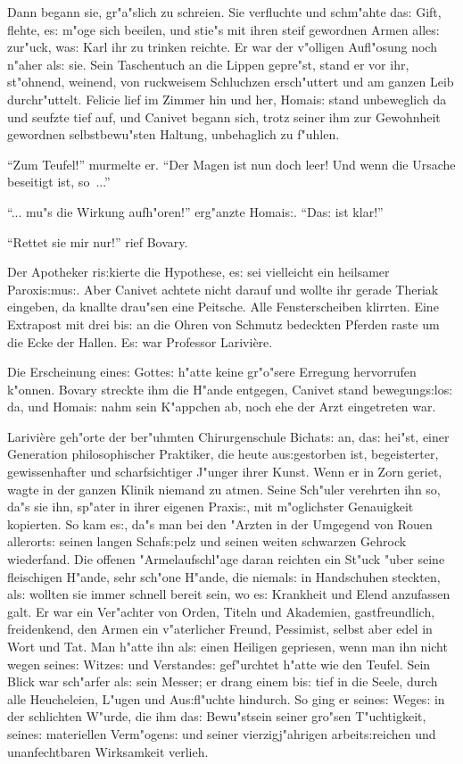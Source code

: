 \documentclass[oneside,12pt]{book}
\newcommand{\s}{s:}%
\begin{document}
Dann begann sie, gr"a"slich zu schreien. Sie verfluchte und
schm"ahte da{\s} Gift, flehte, e{\s} m"oge sich beeilen, und
stie"s mit ihren steif gewordnen Armen alle{\s} zur"uck, wa{\s}
Karl ihr zu trinken reichte. Er war der v"olligen Aufl"osung noch
n"aher al{\s} sie. Sein Taschentuch an die Lippen gepre"st, stand
er vor ihr, st"ohnend, weinend, von ruckweisem Schluchzen
ersch"uttert und am ganzen Leib durchr"uttelt. Felicie lief im
Zimmer hin und her, Homai{\s} stand unbeweglich da und seufzte
tief auf, und Canivet begann sich, trotz seiner ihm zur Gewohnheit
gewordnen selbstbewu"sten Haltung, unbehaglich zu f"uhlen.

"`Zum Teufel!"' murmelte er. "`Der Magen ist nun doch leer! Und
wenn die Ursache beseitigt ist, so~..."'

"`... mu"s die Wirkung aufh"oren!"' erg"anzte Homai{\s}. "`Da{\s}
ist klar!"'

"`Rettet sie mir nur!"' rief Bovary.

Der Apotheker ri{\s}kierte die Hypothese, e{\s} sei vielleicht ein
heilsamer Paroxi{\s}mu{\s}. Aber Canivet achtete nicht darauf und
wollte ihr gerade Theriak eingeben, da knallte drau"sen eine
Peitsche. Alle Fensterscheiben klirrten. Eine Extrapost mit drei
bi{\s} an die Ohren von Schmutz bedeckten Pferden raste um die
Ecke der Hallen. E{\s} war Professor Larivi\`ere.

Die Erscheinung eine{\s} Gotte{\s} h"atte keine gr"o"sere Erregung
hervorrufen k"onnen. Bovary streckte ihm die H"ande entgegen,
Canivet stand bewegung{\s}lo{\s} da, und Homai{\s} nahm sein
K"appchen ab, noch ehe der Arzt eingetreten war.

Larivi\`ere geh"orte der ber"uhmten Chirurgenschule Bichat{\s} an,
da{\s} hei"st, einer Generation philosophischer Praktiker, die
heute au{\s}gestorben ist, begeisterter, gewissenhafter und
scharfsichtiger J"unger ihrer Kunst. Wenn er in Zorn geriet, wagte
in der ganzen Klinik niemand zu atmen. Seine Sch"uler verehrten
ihn so, da"s sie ihn, sp"ater in ihrer eigenen Praxi{\s}, mit
m"oglichster Genauigkeit kopierten. So kam e{\s}, da"s man bei den
"Arzten in der Umgegend von Rouen allerort{\s} seinen langen
Schaf{\s}pelz und seinen weiten schwarzen Gehrock wiederfand. Die
offenen "Armelaufschl"age daran reichten ein St"uck "uber seine
fleischigen H"ande, sehr sch"one H"ande, die niemal{\s} in
Handschuhen steckten, al{\s} wollten sie immer schnell bereit
sein, wo e{\s} Krankheit und Elend anzufassen galt. Er war ein
Ver"achter von Orden, Titeln und Akademien, gastfreundlich,
freidenkend, den Armen ein v"aterlicher Freund, Pessimist, selbst
aber edel in Wort und Tat. Man h"atte ihn al{\s} einen Heiligen
gepriesen, wenn man ihn nicht wegen seine{\s} Witze{\s} und
Verstande{\s} gef"urchtet h"atte wie den Teufel. Sein Blick war
sch"arfer al{\s} sein Messer; er drang einem bi{\s} tief in die
Seele, durch alle Heucheleien, L"ugen und Au{\s}fl"uchte hindurch.
So ging er seine{\s} Wege{\s} in der schlichten W"urde, die ihm
da{\s} Bewu"stsein seiner gro"sen T"uchtigkeit, seine{\s}
materiellen Verm"ogen{\s} und seiner vierzigj"ahrigen
arbeit{\s}reichen und unanfechtbaren Wirksamkeit verlieh.
\end{document}
